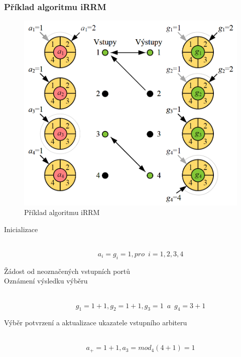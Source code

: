 \subsubsection{Příklad algoritmu iRRM}
\begin{figure}[ht]
\centering
  \begin{center}
    \includegraphics[scale=0.5]{images/iRRM_priklad.png}
  \end{center}
  \caption[Příklad algoritmu iRRM]{Příklad algoritmu iRRM}
\end{figure}
\begin{description}
  \item[Inicializace] \hfill \\
  \begin{equation}
      a_i = g_i = 1, pro \,\,\, i = 1, 2, 3, 4
  \end{equation}
  \item [Žádost od neoznačených vstupních portů] \hfill 
  \item [Oznámení výsledku výběru] \hfill \\
  \begin{equation}
      g_1 = 1 + 1, g_2 = 1 + 1, g_3 = 1\,\,\, a \,\,\, g_4 = 3 + 1
  \end{equation}
  \item [Výběr potvrzení a aktualizace ukazatele vstupního arbiteru] \hfill \\
\begin{equation}
    a_+ = 1 + 1, a_3 = mod_4{(4+1)} = 1
\end{equation}
\end{description}
